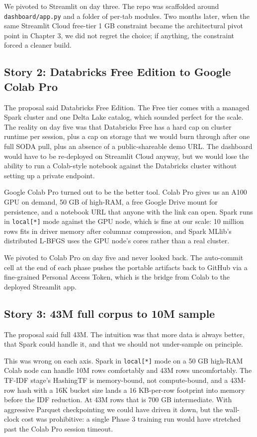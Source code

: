 \documentclass[11pt,letterpaper]{book}
\begin{document}
We pivoted to Streamlit on day three. The repo was scaffolded around \texttt{dashboard/app.py} and a folder of per-tab modules. Two months later, when the same Streamlit Cloud free-tier 1 GB constraint became the architectural pivot point in Chapter 3, we did not regret the choice; if anything, the constraint forced a cleaner build.

\subsection*{Story 2: Databricks Free Edition to Google Colab Pro}

The proposal said Databricks Free Edition. The Free tier comes with a managed Spark cluster and one Delta Lake catalog, which sounded perfect for the scale. The reality on day five was that Databricks Free has a hard cap on cluster runtime per session, plus a cap on storage that we would burn through after one full SODA pull, plus an absence of a public-shareable demo URL. The dashboard would have to be re-deployed on Streamlit Cloud anyway, but we would lose the ability to run a Colab-style notebook against the Databricks cluster without setting up a private endpoint.

Google Colab Pro turned out to be the better tool. Colab Pro gives us an A100 GPU on demand, 50 GB of high-RAM, a free Google Drive mount for persistence, and a notebook URL that anyone with the link can open. Spark runs in \texttt{local[*]} mode against the GPU node, which is fine at our scale: 10 million rows fits in driver memory after columnar compression, and Spark MLlib's distributed L-BFGS uses the GPU node's cores rather than a real cluster.

We pivoted to Colab Pro on day five and never looked back. The auto-commit cell at the end of each phase pushes the portable artifacts back to GitHub via a fine-grained Personal Access Token, which is the bridge from Colab to the deployed Streamlit app.

\subsection*{Story 3: 43M full corpus to 10M sample}

The proposal said full 43M. The intuition was that more data is always better, that Spark could handle it, and that we should not under-sample on principle.

This was wrong on each axis. Spark in \texttt{local[*]} mode on a 50 GB high-RAM Colab node can handle 10M rows comfortably and 43M rows uncomfortably. The TF-IDF stage's HashingTF is memory-bound, not compute-bound, and a 43M-row hash with a 16K bucket size lands a 16 KB-per-row footprint into memory before the IDF reduction. At 43M rows that is 700 GB intermediate. With aggressive Parquet checkpointing we could have driven it down, but the wall-clock cost was prohibitive: a single Phase 3 training run would have stretched past the Colab Pro session timeout.
\end{document}
